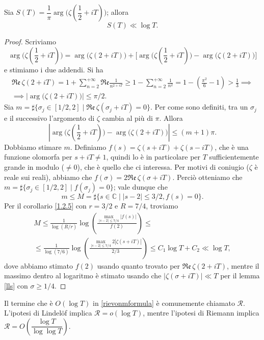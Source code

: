 \begin{lm} \label{Slllog}
  Sia $S(T)=\dfrac{1}{\pi}\arg\Bigg(\zeta\left(\dfrac{1}{2}+iT\right)\Bigg)$; allora
  $$S(T) \ll \log{T}.$$
\end{lm}

\begin{proof}
  Scriviamo $$\arg\Bigg(\zeta\left(\frac{1}{2}+iT\right)\Bigg)=\arg\big(\zeta(2+iT)\big)+\Bigg[\arg\Bigg(\zeta\left(\frac{1}{2}+iT\right)\Bigg)-\arg\big(\zeta(2+iT)\big)\Bigg]$$
  e stimiamo i due addendi. Si ha
  \begin{gather*}
    \mathfrak{Re}\,\zeta(2+iT)=1+\sum_{n=2}^{+\infty} \mathfrak{Re}\frac{1}{n^{2+iT}} \ge 1-\sum_{n=2}^{+\infty} \frac{1}{n^2}=1-\left(\frac{\pi^2}{6}-1\right)>\frac{1}{3} \implies \\
    \implies |\arg\big(\zeta(2+iT)\big)| \le \pi/2.
  \end{gather*}
  Sia $m=\sharp\{\sigma_j \in [1/2,2] \mid \mathfrak{Re}\,\zeta(\sigma_j+iT)=0\}$.
  Per come sono definiti, tra un $\sigma_j$ e il successivo l'argomento di $\zeta$ cambia al più di $\pi$. Allora
  $$\left|\arg\Bigg(\zeta\left(\frac{1}{2}+iT\right)\Bigg)-\arg\big(\zeta(2+iT)\big)\right| \le (m+1)\pi.$$
  Dobbiamo stimare $m$. Definiamo $f(s)=\zeta(s+iT)+\zeta(s-iT)$, che è una funzione olomorfa per $s+iT\not=1$, quindi lo è in particolare per $T$ sufficientemente grande in modulo ($\not=0$), che è quello che ci interessa. Per motivi di coniugio ($\zeta$ è reale sui reali), abbiamo che $f(\sigma)=2\mathfrak{Re}\,\zeta(\sigma+iT)$. Perciò otteniamo che $m=\sharp\{\sigma_j \in [1/2,2] \mid f(\sigma_j)=0\}$; vale dunque che
  $$m \le M=\sharp\{s \in \mathbb{C} \mid |s-2| \le 3/2, f(s)=0\}.$$
  Per il corollario \ref{1.2.5} con $r=3/2$ e $R=7/4$, troviamo
  \begin{gather*}
    M \le \frac{1}{\log(R/r)}\log\left(\frac{\max_{|s-2| \le 7/4}|f(s)|}{f(2)}\right) \le \\
    \le \frac{1}{\log(7/6)}\log\left(\frac{\max_{|s-2| \le 7/4} 2|\zeta(s+iT)|}{2/3}\right) \le C_1\log{T}+C_2 \ll \log{T},
  \end{gather*}
  dove abbiamo stimato $f(2)$ usando quanto trovato per $\mathfrak{Re}\,\zeta(2+iT)$, mentre il massimo dentro al logaritmo è stimato usando che $|\zeta(\sigma+iT)| \ll T$ per il lemma \ref{lls} con $\sigma \ge 1/4$.
\end{proof}

\begin{ftt}
  Il termine che è $O(\log{T})$ in \eqref{rievonmformula} è comunemente chiamato $\mathcal{R}$. L'ipotesi di Lindelöf implica $\mathcal{R}=o(\log{T})$, mentre l'ipotesi di Riemann implica $\mathcal{R}=O\left(\dfrac{\log{T}}{\log{\log{T}}}\right)$.
\end{ftt}

